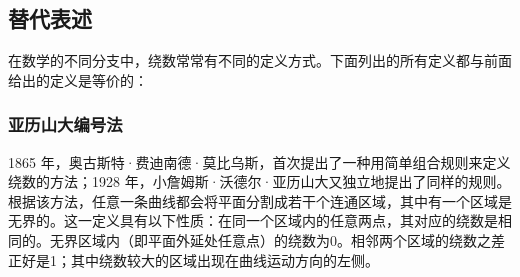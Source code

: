 \subsection{替代表述}
在数学的不同分支中，绕数常常有不同的定义方式。下面列出的所有定义都与前面给出的定义是等价的：
\subsubsection{亚历山大编号法}
1865 年，奥古斯特·费迪南德·莫比乌斯，首次提出了一种用简单组合规则来定义绕数的方法；1928 年，小詹姆斯·沃德尔·亚历山大又独立地提出了同样的规则。根据该方法，任意一条曲线都会将平面分割成若干个连通区域，其中有一个区域是无界的。这一定义具有以下性质：在同一个区域内的任意两点，其对应的绕数是相同的。无界区域内（即平面外延处任意点）的绕数为0。相邻两个区域的绕数之差正好是1；其中绕数较大的区域出现在曲线运动方向的左侧。
